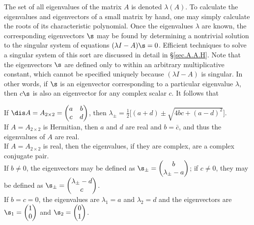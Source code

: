 The set of all eigenvalues of the matrix $A$ is denoted
$\lambda(A)$.  To calculate the eigenvalues and eigenvectors of a
small matrix by hand, one may simply calculate the roots of its characteristic polynomial.  Once the eigenvalues $\lambda$ are known, the
corresponding eigenvectors $\s$ may be found by determining a nontrivial solution to the singular
system of equations $(\lambda I - A) \s=0$.  Efficient techniques to
solve a singular system of this sort are discussed in detail
in \S \ref{sec.A.A.H}.  Note that the eigenvectors $\s$ are defined only to within
an arbitrary multiplicative constant, which cannot be specified
uniquely because $(\lambda I - A)$ is singular.  In other words, if
$\s$ is an eigenvector corresponding to a particular eigenvalue
$\lambda$, then $c \s$ is also an eigenvector for any complex scalar
$c$.  It follows that

\begin{fact} \label{fact.A.C.A.B}
If $\dis A=A_{2\times 2}=\begin{pmatrix} a & b\\ c& d\end{pmatrix}$, then
$\lambda_{\pm}=\frac{1}{2} \big[(a+d) \pm \sqrt{4bc+(a-d)^2}\big]$.\\
If $A=A_{2\times 2}$ is Hermitian, then $a$ and $d$ are real and $b=\bar c$, and thus the eigenvalues of $A$ are real.\\
If $A=A_{2\times 2}$ is real, then the eigenvalues, if they are complex, are a complex conjugate pair.\\
If $b\ne 0$, the eigenvectors may be defined as
$\s_\pm = \begin{pmatrix} b \\ \lambda_{\pm} - a \end{pmatrix}$; if $c\ne 0$, they may be defined as
$\s_\pm = \begin{pmatrix} \lambda_{\pm} - d \\ c \end{pmatrix}$.\\
If $b=c=0$, the eigenvalues are $\lambda_1=a$ and $\lambda_2=d$ and the eigenvectors are
$\s_1=\begin{pmatrix} 1 \\ 0 \end{pmatrix}$ and $\s_2=\begin{pmatrix} 0 \\ 1 \end{pmatrix}$.
\end{fact}

